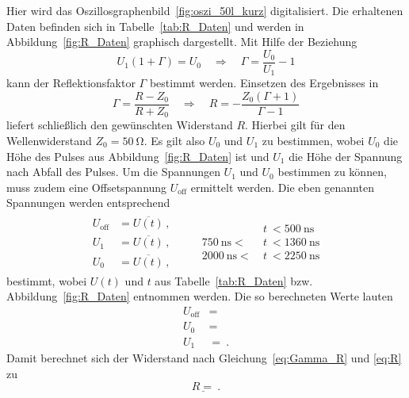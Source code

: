 Hier wird das Oszillosgraphenbild~\ref{fig:oszi_50l_kurz} digitalisiert.
Die erhaltenen Daten befinden sich in Tabelle~\ref{tab:R_Daten} und werden
in Abbildung~\ref{fig:R_Daten} graphisch dargestellt.
Mit Hilfe der Beziehung
\begin{equation}
  U_1 (1 + \Gamma) = U_0 \quad \Rightarrow \quad \Gamma = \frac{U_0}{U_1} - 1
  \label{eq:Gamma_R}
\end{equation}
kann der Reflektionsfaktor $\Gamma$ bestimmt werden. Einsetzen des Ergebnisses
in
\begin{equation}
  \Gamma = \frac{R-Z_0}{R+Z_0} \quad \Rightarrow \quad
  R = - \frac{Z_0(\Gamma + 1)}{\Gamma - 1}
  \label{eq:R}
\end{equation}
liefert schließlich den gewünschten Widerstand $R$.
Hierbei gilt für den Wellenwiderstand $Z_0 = \SI{50}{\ohm}$.
Es gilt also $U_0$ und $U_1$ zu bestimmen, wobei $U_0$ die Höhe des Pulses aus
Abbildung~\ref{fig:R_Daten} ist und $U_1$ die Höhe der Spannung nach Abfall des
Pulses. Um die Spannungen $U_1$ und $U_0$ bestimmen zu können, muss zudem eine
Offsetspannung $U_\text{off}$ ermittelt werden.
Die eben genannten Spannungen werden entsprechend
\begin{align}
  \begin{aligned}
    U_\text{off} &= \overline{U(t)}\,, \\
    U_1          &= \overline{U(t)}\,, \\
    U_0          &= \overline{U(t)}\,,
  \end{aligned}
  \qquad
  \begin{aligned}
    &t~< \SI{500}{\nano\second} \\
    \SI{750}{\nano\second}  <~&t~< \SI{1360}{\nano\second} \\
    \SI{2000}{\nano\second} <~&t~< \SI{2250}{\nano\second}
  \end{aligned}
\end{align}
bestimmt, wobei $U(t)$ und $t$ aus Tabelle~\ref{tab:R_Daten} bzw.
Abbildung~\ref{fig:R_Daten} entnommen werden.
Die so berechneten Werte lauten
\begin{align}
  U_\text{off} &=  \\
  U_0 &=  \\
  U_1 &= ~.
\end{align}
Damit berechnet sich der Widerstand nach Gleichung~\eqref{eq:Gamma_R} und
\eqref{eq:R} zu
\begin{equation}
  \underline{R = }~.
\end{equation}

